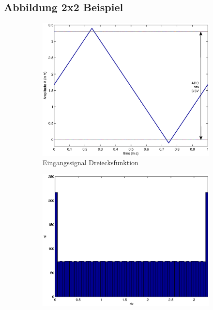 \documentclass[SSS_Laborbericht.tex]{subfiles}
\begin{document}
\subsection{Abbildung 2x2 Beispiel}
\begin{figure}[H]
	\begin{subfigure}{.499\textwidth}
		\centering\small
		\includegraphics[width=\textwidth]{media/matlab/HISTOGRAM/ramp_fkt_samples_5000.eps}
		\caption{Eingangssignal Dreiecksfunktion}
		\label{fig:GRUNDL_RAMP_RAMP_2X2}
	\end{subfigure}
	\begin{subfigure}{.499\textwidth}
		\centering\small
		\includegraphics[width=\textwidth]{media/matlab/HISTOGRAM/ramp_hist_samples_5000.eps}

\end{subfigure}
\end{figure}
\end{document}
